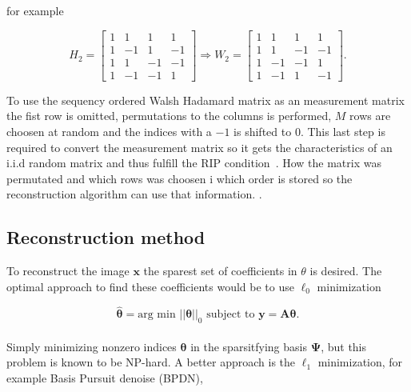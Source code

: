 for example

\begin{equation}
    H_2 =  \begin{bmatrix}
       1 & 1 & 1 & 1 \\
       1 & -1 & 1 & -1 \\
       1 & 1 & -1 & -1 \\
       1 & -1 & -1 & 1 
       \end{bmatrix} \Rightarrow W_2 = \begin{bmatrix}
       1 & 1 & 1 & 1 \\
       1 & 1 & -1 & -1  \\
       1 & -1 & -1 & 1  \\
       1 & -1 & 1 & -1 
       \end{bmatrix}.
\end{equation}

To use the sequency ordered Walsh Hadamard matrix as an measurement matrix the fist row is omitted, permutations to the columns is performed, $M$ rows are choosen at random and the indices with a $-1$ is shifted to $0$. This last step is required to convert the measurement matrix so it gets the characteristics of an i.i.d random matrix and thus fulfill the RIP condition~\cite{article:SRM_long, article:WH_RIP_SRM, article:WH_mixed_RIP_prof}. How the matrix was permutated and which rows was choosen i which order is stored so the reconstruction algorithm can use that information. \cite{article:SRM_long, article:TVAL3, article:an_improved_WH_matrix}. 


\subsection{Reconstruction method}
To reconstruct the image $\textbf{x}$ the sparest set of coefficients in $\theta$ is desired. The optimal approach to find these coefficients would be to use $\ell_0$ minimization


\begin{equation}
   \mathbf{ \hat{\theta}} = \text{arg min } ||\mathbf{\theta}||_0 \text{  subject to  } \mathbf{y = A\theta} \text{.}
\end{equation}\\[0.1in]


Simply minimizing nonzero indices $\mathbf{\theta}$ in the sparsitfying basis $\mathbf{\Psi}$, but this problem is known to be NP-hard. A better approach is the $\ell_1$ minimization, for example Basis Pursuit denoise (BPDN),

